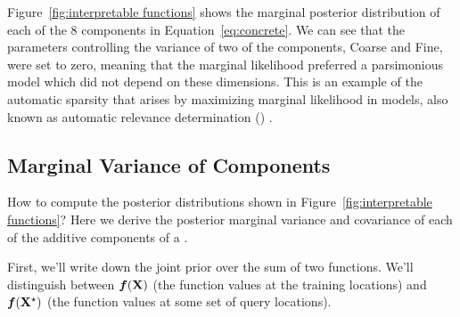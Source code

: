 Figure~\ref{fig:interpretable functions} shows the marginal posterior distribution of each of the 8 components in Equation~\eqref{eq:concrete}.
We can see that the parameters controlling the variance of two of the components, Coarse and Fine, were set to zero, meaning that the marginal likelihood preferred a parsimonious model which did not depend on these dimensions.
This is an example of the automatic sparsity that arises by maximizing marginal likelihood in \gp{} models, also known as automatic relevance determination (\ARD) \citep{neal1995bayesian}.



\subsection{Marginal Variance of Components}

How to compute the posterior distributions shown in Figure~\ref{fig:interpretable functions}?
Here we derive the posterior marginal variance and covariance of each of the additive components of a \gp{}.


First, we'll write down the joint prior over the sum of two functions.
We'll distinguish between $\boldsymbol{f}(\mathbf{X})$ (the function values at the training locations) and  $\boldsymbol{f}(\mathbf{X}^\star)$ (the function values at some set of query locations).

